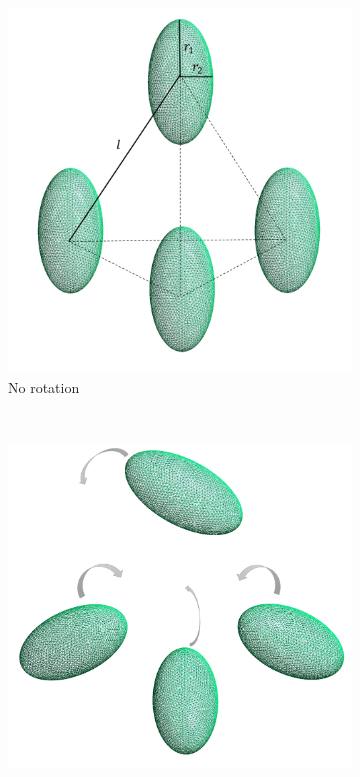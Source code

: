 \begin{figure}[H]
    \begin{subfigure}{\linewidth}
        \centering
        \includegraphics[scale = 0.4]{figures/4_ellip}
        \caption{No rotation}
        \label{No rotation 4}
        \end{subfigure}\\[1ex]
    \begin{subfigure}{.5\linewidth}
    \centering
    \includegraphics[scale = 0.4]{figures/4_ellip_in}

\end{subfigure}
\end{figure}
